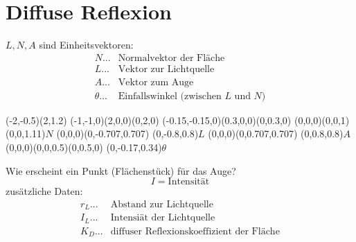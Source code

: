 \section{Diffuse Reflexion}
	$L, N, A$ sind Einheitsvektoren:
	\begin{align*}
	 N... &\text{Normalvektor der Fläche}\\
	 L... &\text{Vektor zur Lichtquelle}\\
	 A... &\text{Vektor zum Auge}\\
	 \theta... &\text{Einfallswinkel (zwischen $L$ und $N$)}
	\end{align*}
	\begin{center}
	 \begin{pspicture}(-2,-0.5)(2,1.2)
	  \pstThreeDSquare(-1,-1,0)(2,0,0)(0,2,0)
	  \pstThreeDSquare(-0.15,-0.15,0)(0.3,0,0)(0,0.3,0)
	  \pstThreeDLine{->}(0,0,0)(0,0,1)
	  \pstThreeDPut(0,0,1.11){$N$}
	  \pstThreeDLine{->}(0,0,0)(0,-0.707,0.707)
	  \pstThreeDPut(0,-0.8,0.8){$L$}
	  \pstThreeDLine{->}(0,0,0)(0,0.707,0.707)
	  \pstThreeDPut(0,0.8,0.8){$A$}
	  \pstThreeDCircle[beginAngle=0,endAngle=-45,arrows=<->](0,0,0)(0,0,0.5)(0,0.5,0)
	  \pstThreeDPut(0,-0.17,0.34){$\theta$}
	 \end{pspicture}
	\end{center}
	Wie erscheint ein Punkt (Flächenstück) für das Auge?
	\[I = \text{Intensität}\]
	zusätzliche Daten:
	\begin{align*}
	 r_L... &\text{Abstand zur Lichtquelle}\\
	 I_L... &\text{Intensiät der Lichtquelle}\\
	 K_D... &\text{diffuser Reflexionskoeffizient der Fläche}
	\end{align*}

